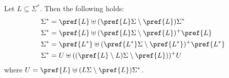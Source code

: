 \begin{proposition} \label{constrsync:eqn:partitions}
	Let $L \subseteq \Sigma^*$. Then the following holds:
	\begin{align}
		\Sigma^* & = \pref{L} \uplus (  \pref{L} \Sigma  \setminus \pref{L} ) \Sigma^* \label{prelim:eqn:prefcomplement} \\			
		\Sigma^* & = \pref{L} \uplus (\pref{L}\Sigma \setminus \pref{L} )^+ \pref{L} \label{constrsync:eqn:partitions:item:strong0} \\
		\Sigma^* & = \pref{L^*} \uplus (\pref{L^*}\Sigma \setminus \pref{L^*})^+ \pref{L^*} \label{constrsync:eqn:partitions:item:weak1} \\
		\Sigma^* & = U \uplus (  ( \pref{L} \setminus L )\Sigma \setminus \pref{L} ) )^+ U	\label{constrsync:eqn:partitions:strong}
	\end{align}	
	where $U = \pref{L} \uplus ( L\Sigma \setminus \pref{L} ) \Sigma^*$.
\end{proposition}
